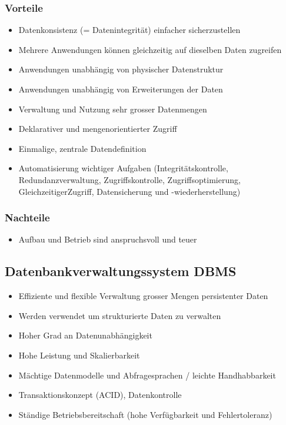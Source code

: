 \documentclass[8pt,a4paper]{scrartcl}
\begin{document}
\begin{multicols*}{3}
				\subsubsection{Vorteile}
					\begin{itemize}\itemsep0pt		
						\item Datenkonsistenz (= Datenintegrität) einfacher sicherzustellen
						\item Mehrere Anwendungen können gleichzeitig auf dieselben Daten zugreifen
						\item Anwendungen unabhängig von physischer Datenstruktur
						\item Anwendungen unabhängig von Erweiterungen der Daten
						\item Verwaltung und Nutzung sehr grosser Datenmengen
						\item Deklarativer und mengenorientierter Zugriff
						\item Einmalige, zentrale Datendefinition
						\item Automatisierung wichtiger Aufgaben (Integritätskontrolle, Redundanzverwaltung, Zugriffskontrolle, Zugriffsoptimierung, GleichzeitigerZugriff, Datensicherung und -wiederherstellung)
					\end{itemize}
					
				\subsubsection{Nachteile}
					\begin{itemize}\itemsep0pt		
						\item Aufbau und Betrieb sind anspruchsvoll und teuer
					\end{itemize}
				
			\subsection{Datenbankverwaltungssystem DBMS}
				\begin{itemize}\itemsep0pt				
					\item Effiziente und flexible Verwaltung grosser Mengen persistenter Daten
					\item Werden verwendet um strukturierte Daten zu verwalten
					\item Hoher Grad an Datenunabhängigkeit
					\item Hohe Leistung und Skalierbarkeit
					\item Mächtige Datenmodelle und Abfragesprachen / leichte Handhabbarkeit
					\item Transaktionskonzept (ACID), Datenkontrolle
					\item Ständige Betriebsbereitschaft (hohe Verfügbarkeit und Fehlertoleranz)
				\end{itemize}
				

\end{multicols*}
\end{document}
